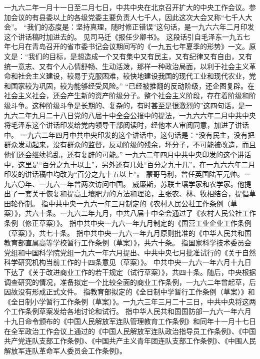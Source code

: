 \begin{maonote}
一九六二年一月十一日至二月七日，中共中央在北京召开扩大的中央工作会议。参加会议的有县委以上的各级党委主要负责人七千人，因此这次大会又称“七千人大会”。
“我们的态度是：坚持真理，随时修正错误”这句话，是一九六六年二月印发这个讲话稿时加进去的。
见司马迁《报任少卿书》。
这段话引自毛泽东一九五七年七月在青岛召开的省市委书记会议期间写的《一九五七年夏季的形势》一文。原文是：“我们的目标，是想造成一个又有集中又有民主，又有纪律又有自由，又有统一意志、又有个人心情舒畅、生动活泼，那样一种政治局面，以利于社会主义革命和社会主义建设，较易于克服困难，较快地建设我国的现代工业和现代农业，党和国家较为巩固，较为能够经受风险。”
“已经被推翻的反动阶级，还企图复辟。在社会主义社会，还会产生新的资产阶级分子。整个社会主义阶段，存在着阶级和阶级斗争。这种阶级斗争是长期的、复杂的，有时甚至是很激烈的”这四句话，是一九六二年九月二十八日党的八届十中全会公报中的提法，一九六六年二月中共中央将毛泽东这个讲话印发给党内领导干部阅读时，经他本人审阅同意，加进了讲话中。
一九六二年四月中共中央印发的这个讲话中，这句话是：“没有民主，没有把群众发动起来，没有群众的监督，反动阶级的残余，坏分子，不可能被改造，而且他们还会继续捣乱，还有复辟的可能。”
一九六二年四月中共中央印发的这个讲话中，这里是“百分之九十以上”，另外还有几处“百分之九十几”，在一九六六年二月印发的讲话稿中均改为“百分之九十五以上”。
蒙哥马利，曾任英国陆军元帅。一九六〇年、一九六一年曾两次访问中国。
威廉斯，苏联土壤学家和农学家。他提出了一套关于恢复和提高土壤肥力的方法和理论，主张农、林、牧相结合，提倡草田轮作制。
指中共中央一九六一年三月制定的《农村人民公社工作条例（草案）》，共六十条。一九六二年九月，中共八届十中全会通过了《农村人民公社工作条例（修正草案）》。
指中共中央一九六一年九月制定的《国营工业企业工作条例（草案）》，共七十条。
指中共中央一九六一年九月原则批准的《中华人民共和国教育部直属高等学校暂行工作条例（草案）》，共六十条。
指国家科学技术委员会党组和中国科学院党组一九六一年六月提出、中共中央七月批准试行的《关于自然科学研究机构当前工作的十四条意见（草案）》。
中共中央一九六一年六月十九日下达了《关于改进商业工作的若干规定（试行草案）》，共四十条。随后，中央根据调查研究的情况，准备拟定一个比较全面的商业工作条例，一九六二年曾起草，后因故没有形成正式文件。
指教育部拟定的《全日制中学暂行工作条例（草案）》和《全日制小学暂行工作条例（草案）》。一九六三年三月二十三日，中共中央将这两个工作条例草案发给各地讨论和试行。
指中华人民共和国国防部一九六一年六月十九日命令颁布的《中国人民解放军连队管理教育工作条例》和同年十一月十七日在全军政治工作会议上通过的《中国人民解放军连队政治指导员工作条例》、《中国共产党连队支部工作条例》、《中国共产主义青年团连队支部工作条例》、《中围人民解放军连队革命军人委员会工作条例》。

\end{maonote}
